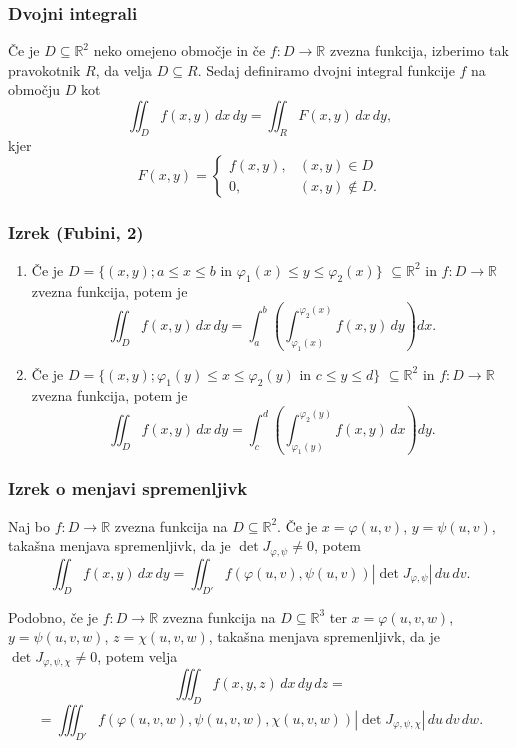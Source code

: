 \documentclass{article}
\begin{document}
\begin{multicols}{2}
	\subsubsection{Dvojni integrali}

	Če je \( D \subseteq \mathbb{R}^2 \) neko omejeno območje in če \( f: D \rightarrow \mathbb{R} \) zvezna funkcija, izberimo tak pravokotnik \( R \), da velja \( D \subseteq R \). Sedaj definiramo dvojni integral funkcije \( f \) na območju \( D \) kot
	\[
		\iint_D f(x,y) \,dx\,dy = \iint_R F(x,y) \,dx\,dy,
	\]
	kjer
	\[
		F(x,y) = \begin{cases}
			f(x,y), & (x,y) \in D      \\
			0,      & (x,y) \not\in D.
		\end{cases}
	\]

	\subsubsection{Izrek (Fubini, 2)}
	\begin{enumerate}
		\item Če je \( D = \{(x,y); a \leq x \leq b \text{ in } \varphi_1(x) \leq y \leq \varphi_2(x)\} \) \( \subseteq \mathbb{R}^2 \) in \( f: D \rightarrow \mathbb{R} \) zvezna funkcija, potem je
		      \[
			      \iint_D f(x,y) \,dx\,dy = \int_a^b \left( \int_{\varphi_1(x)}^{\varphi_2(x)} f(x,y) \,dy \right) dx.
		      \]

		\item Če je \( D = \{(x,y); \varphi_1(y) \leq x \leq \varphi_2(y) \text{ in } c \leq y \leq d\} \) \( \subseteq \mathbb{R}^2 \) in \( f: D \rightarrow \mathbb{R} \) zvezna funkcija, potem je
		      \[
			      \iint_D f(x,y) \,dx\,dy = \int_c^d \left( \int_{\varphi_1(y)}^{\varphi_2(y)} f(x,y) \,dx \right) dy.
		      \]
	\end{enumerate}

	\subsubsection{Izrek o menjavi spremenljivk}
	Naj bo \( f: D \rightarrow \mathbb{R} \) zvezna funkcija na \( D \subseteq \mathbb{R}^2 \). Če je \( x = \varphi(u, v) \), \( y = \psi(u, v) \), takašna menjava spremenljivk, da je \( \det J_{\varphi,\psi} \neq 0 \), potem
	\[
		\iint_D f(x, y) \,dx\,dy = \iint_{D'} f(\varphi(u, v), \psi(u, v)) \left| \det J_{\varphi,\psi} \right| \,du\,dv.
	\]

	Podobno, če je \( f: D \rightarrow \mathbb{R} \) zvezna funkcija na \( D \subseteq \mathbb{R}^3 \) ter \( x = \varphi(u, v, w) \), \( y = \psi(u, v, w) \), \( z = \chi(u, v, w) \), takašna menjava spremenljivk, da je \( \det J_{\varphi,\psi,\chi} \neq 0 \), potem velja
	\[
		\iiint_D f(x, y, z) \,dx\,dy\,dz =
	\]
	\[
		= \iiint_{D'} f(\varphi(u, v, w), \psi(u, v, w), \chi(u, v, w)) \left| \det J_{\varphi,\psi,\chi} \right| \,du\,dv\,dw.
	\]


\end{multicols}
\end{document}
